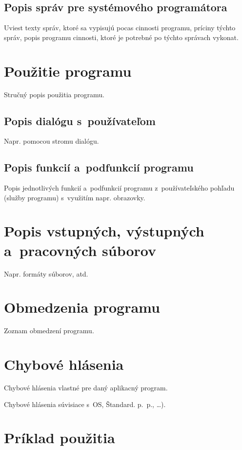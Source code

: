 \documentclass[a4paper]{feidippp}
\begin{document}
\subsection{Popis správ pre systémového programátora}

Uviest texty správ, ktoré sa vypisujú pocas cinnosti programu, príciny týchto správ, popis programu cinnosti, ktoré je potrebné po týchto správach vykonat.

\section{Použitie programu}
Stručný popis použitia programu.

\subsection{Popis dialógu s~používateľom}

Napr. pomocou stromu dialógu.

\subsection{Popis funkcií a~podfunkcií programu}

Popis jednotlivých funkcií a~podfunkcií programu z~používateľského pohľadu (služby programu) s~využitím napr.  obrazovky.

\section{Popis vstupných, výstupných a~pracovných súborov}

Napr. formáty súborov, atd.

\section{Obmedzenia programu}

Zoznam obmedzení programu.

\section{Chybové hlásenia}

Chybové hlásenia vlastné pre daný aplikacný program.

Chybové hlásenia súvisiace s~OS, Štandard. p.~p., \dots).

\section{Príklad použitia}
\end{document}
